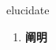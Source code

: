 
\begin{frame}
{\huge elucidate}
\begin{center}
\begin{enumerate}\Large
  \item \textbf{阐明}
\end{enumerate}
\end{center}
\end{frame}
